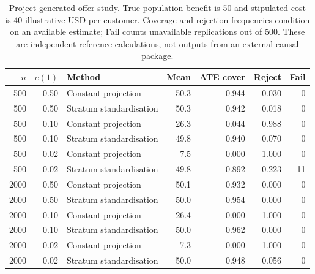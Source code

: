 \begin{table}[htbp]
\centering\small
\begin{tabular}{rrlrrrr}
\toprule
$n$ & $e(1)$ & Method & Mean & ATE cover & Reject & Fail \\
\midrule
500 & 0.50 & Constant projection & 50.3 & 0.944 & 0.030 & 0 \\
500 & 0.50 & Stratum standardisation & 50.3 & 0.942 & 0.018 & 0 \\
500 & 0.10 & Constant projection & 26.3 & 0.044 & 0.988 & 0 \\
500 & 0.10 & Stratum standardisation & 49.8 & 0.940 & 0.070 & 0 \\
500 & 0.02 & Constant projection & 7.5 & 0.000 & 1.000 & 0 \\
500 & 0.02 & Stratum standardisation & 49.8 & 0.892 & 0.223 & 11 \\
2000 & 0.50 & Constant projection & 50.1 & 0.932 & 0.000 & 0 \\
2000 & 0.50 & Stratum standardisation & 50.0 & 0.954 & 0.000 & 0 \\
2000 & 0.10 & Constant projection & 26.4 & 0.000 & 1.000 & 0 \\
2000 & 0.10 & Stratum standardisation & 50.0 & 0.962 & 0.000 & 0 \\
2000 & 0.02 & Constant projection & 7.3 & 0.000 & 1.000 & 0 \\
2000 & 0.02 & Stratum standardisation & 50.0 & 0.948 & 0.056 & 0 \\
\bottomrule
\end{tabular}
\caption{Project-generated offer study. True population benefit is 50 and
stipulated cost is 40 illustrative USD per customer. Coverage and rejection
frequencies condition on an available estimate; Fail counts unavailable
replications out of 500. These are independent reference calculations,
not outputs from an external causal package.}
\label{scisyn:offer-results}
\end{table}
